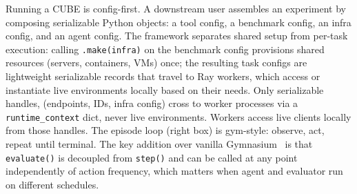 \documentclass{article}
\begin{document}
Running a CUBE is config-first. A downstream user assembles an experiment by composing serializable Python objects: a tool config, a benchmark config, an infra config, and an agent config.
The framework separates shared setup from per-task execution: calling \texttt{.make(infra)} on the benchmark config provisions shared resources (servers, containers, VMs) once; the resulting task configs are lightweight serializable records that travel to Ray workers, which access or instantiate live environments locally based on their needs.
Only serializable handles, (endpoints, IDs, infra config) cross to worker processes via a \texttt{runtime\_context} dict, never live environments. Workers access live clients locally from those handles.
The episode loop (right box) is gym-style: observe, act, repeat until terminal.
The key addition over vanilla Gymnasium~\citep{towers2024gymnasium} is that \texttt{evaluate()} is decoupled from \texttt{step()} and can be called at any point independently of action frequency, which matters when agent and evaluator run on different schedules.
\end{document}
